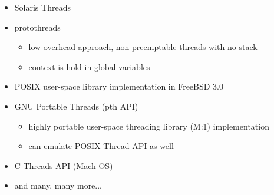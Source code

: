 \begin{itemize}
\item Solaris Threads
\item protothreads
	\begin{itemize}
	\item low-overhead approach, non-preemptable threads with no stack
	\item context is hold in global variables
	\end{itemize}
\item POSIX user-space library implementation in FreeBSD 3.0
\item GNU Portable Threads (pth API)
	\begin{itemize}
	\item highly portable user-space threading library (M:1) implementation
	\item can emulate POSIX Thread API as well
	\end{itemize}
\item C Threads API (Mach OS)
\item and many, many more...
\end{itemize}

